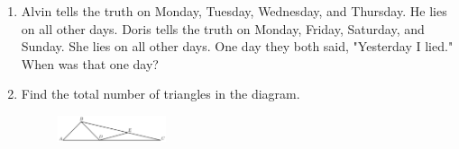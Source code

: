 \documentclass[11pt]{scrartcl}
\begin{document}
\begin{enumerate}
    \item Alvin tells the truth on Monday, Tuesday, Wednesday, and Thursday. He lies on all other days. Doris tells the truth on Monday, Friday, Saturday, and Sunday. She lies on all other days. One day they both said, "Yesterday I lied." When was that one day?

        
    \item Find the total number of triangles in the diagram.
    \begin{figure}[h]
        \centering
        \includegraphics[width=0.3\textwidth]{StarGen/G7-8 and G3-4/triangle.png}
    \end{figure}
\end{enumerate}
\end{document}
